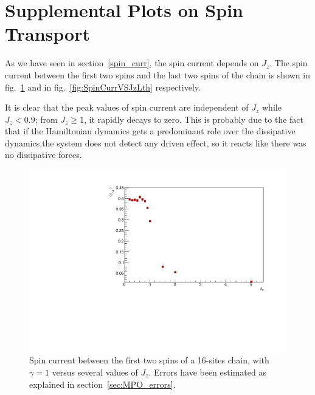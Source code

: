 \section{Supplemental Plots on Spin Transport}
As we have seen in section~\ref{spin_curr}, the spin current depends on $J_z$. The spin current between the first two spins and the last two spins of the chain is shown in fig.~\ref{fig:SpinCurrVSJz1st} and in fig.~\ref{fig:SpinCurrVSJzLth} respectively. 

It is clear that the peak values of spin current are independent of $J_z$ while $J_z < 0.9$; from $J_z \geq 1$, it rapidly decays to zero. This is probably due to the fact that if the Hamiltonian dynamics gets a predominant role over the dissipative dynamics,the system does not detect any driven effect, so it reacts like there was no dissipative forces.

\begin{figure}[H]
    \centering
    \captionsetup{width=1.\linewidth}
    \includegraphics[scale=0.6]{Figures/SpinCurrVSJz1st.pdf}
    \caption{Spin current between the first two spins of a 16-sites chain, with $\gamma=1$ versus several values of $J_z$. Errors have been estimated as explained in section~\ref{sec:MPO_errors}.}
    \label{fig:SpinCurrVSJz1st}
\end{figure}

